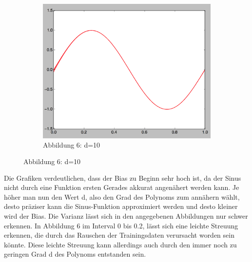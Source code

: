 \documentclass[a4paper,11pt,twoside]{article}
\begin{document}
\begin{figure}[h]
\begin{subfigure}[t]{0.33\textwidth}
		\includegraphics[width=\textwidth]{images/Nr_1/d_10.png}
		\caption{Abbildung 6: d=10}
	\end{subfigure}
\end{figure}

Die Grafiken verdeutlichen, dass der Bias zu Beginn sehr hoch ist, da der Sinus nicht durch eine Funktion ersten Gerades akkurat angenähert werden kann. Je höher man nun den Wert d, also den Grad des Polynoms zum annähern wählt, desto präziser kann die Sinus-Funktion approximiert werden und desto kleiner wird der Bias. Die Varianz lässt sich in den angegebenen Abbildungen nur schwer erkennen. In Abbildung 6 im Interval 0 bis 0.2, lässt sich eine leichte Streuung erkennen, die durch das Rauschen der Trainingsdaten verursacht worden sein könnte. Diese leichte Streuung kann allerdings auch durch den immer noch zu geringen Grad d des Polynoms entstanden sein.
\end{document}

